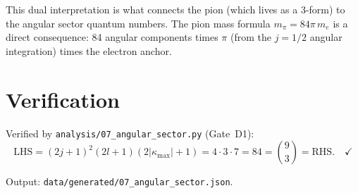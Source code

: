 \documentclass[11pt,letterpaper]{article}
\numberwithin{equation}{section}
\begin{document}
This dual interpretation is what connects the pion (which lives as a 3-form)
to the angular sector quantum numbers. The pion mass formula
$m_\pi = 84\pi\,m_e$ is a direct consequence: 84 angular components times
$\pi$ (from the $j = 1/2$ angular integration) times the electron anchor.

\section{Verification}
\label{sec:verification}

Verified by \texttt{analysis/07\_angular\_sector.py} (Gate~D1):
\begin{equation}
  \text{LHS} = (2j+1)^2(2l+1)(2|\kappa_\mathrm{max}|+1) = 4 \cdot 3 \cdot 7 = 84
  = \binom{9}{3} = \text{RHS}. \quad \checkmark
\end{equation}

Output: \texttt{data/generated/07\_angular\_sector.json}.
\end{document}
